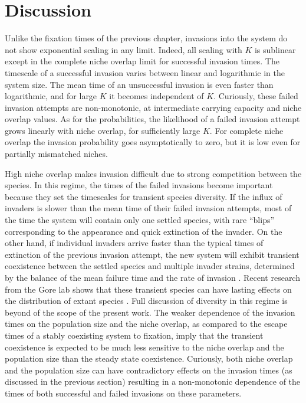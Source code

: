 \section{Discussion} \label{DiscussionOfOneAttemptedInvasion}
Unlike the fixation times of the previous chapter, invasions into the system do not show exponential scaling in any limit. 
Indeed, all scaling with $K$ is sublinear except in the complete niche overlap limit for successful invasion times. 
The timescale of a successful invasion varies between linear and logarithmic in the system size. 
The mean time of an unsuccessful invasion is even faster than logarithmic, and for large $K$ it becomes independent of $K$. 
Curiously, these failed invasion attempts are non-monotonic, at intermediate carrying capacity and niche overlap values. %
As for the probabilities, the likelihood of a failed invasion attempt grows linearly with niche overlap, for sufficiently large $K$. 
For complete niche overlap the invasion probability goes asymptotically to zero, but it is low even for partially mismatched niches. 

High niche overlap makes invasion difficult due to strong competition between the species. 
In this regime, the times of the failed invasions become important because they set the timescales for transient species diversity. 
If the influx of invaders is slower than the mean time of their failed invasion attempts, most of the time the system will contain only one settled species, with rare ``blips'' corresponding to the appearance and quick extinction of the invader. 
On the other hand, if individual invaders arrive faster than the typical times of extinction of the previous invasion attempt, the new system will exhibit transient coexistence between the settled species and multiple invader strains, determined by the balance of the mean failure time and the rate of invasion \cite{Dias1996,Chesson2000,Hubbell2001,Desai2007,Carroll2015}. 
Recent research from the Gore lab shows that these transient species can have lasting effects on the distribution of extant species \cite{Amor2019}. %
Full discussion of diversity in this regime is beyond of the scope of the present work. %
The weaker dependence of the invasion times on the population size and the niche overlap, as compared to the escape times of a stably coexisting system to fixation, imply that the transient coexistence is expected to be much less sensitive to the niche overlap and the population size than the steady state coexistence. 
Curiously, both niche overlap and the population size can have contradictory effects on the invasion times (as discussed in the previous section) resulting in a non-monotonic dependence of the times of both successful and failed invasions on these parameters. 

